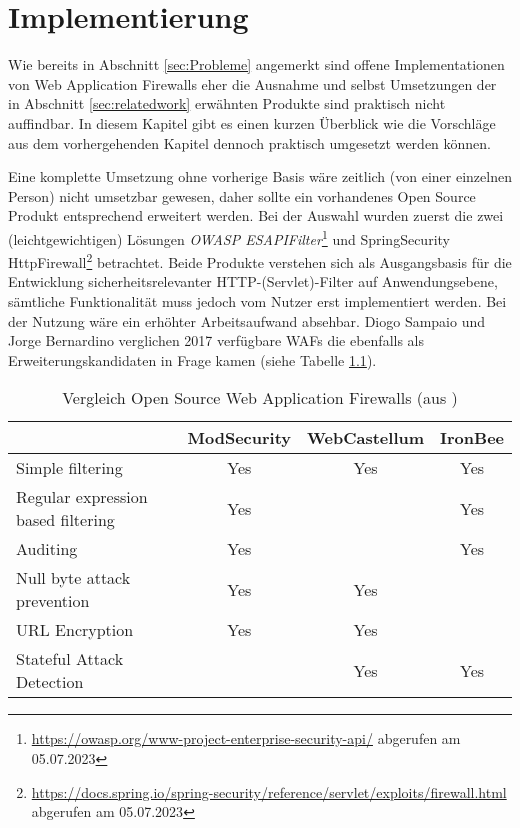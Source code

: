 \chapter{Implementierung}



Wie bereits in Abschnitt \ref{sec:Probleme} angemerkt sind offene Implementationen von Web Application Firewalls eher die Ausnahme und selbst Umsetzungen der in Abschnitt \ref{sec:relatedwork} erwähnten Produkte sind praktisch nicht auffindbar. In diesem Kapitel gibt es einen kurzen Überblick wie die Vorschläge aus dem vorhergehenden Kapitel dennoch praktisch umgesetzt werden können.

Eine komplette Umsetzung ohne vorherige Basis wäre zeitlich (von einer einzelnen Person) nicht umsetzbar gewesen, daher sollte ein vorhandenes Open Source Produkt entsprechend erweitert werden. Bei der Auswahl wurden zuerst die zwei (leichtgewichtigen) Lösungen \emph{OWASP ESAPIFilter}\footnote{\url{https://owasp.org/www-project-enterprise-security-api/} abgerufen am 05.07.2023} und {SpringSecurity HttpFirewall}\footnote{\url{https://docs.spring.io/spring-security/reference/servlet/exploits/firewall.html} abgerufen am 05.07.2023} betrachtet. Beide Produkte verstehen sich als Ausgangsbasis für die Entwicklung sicherheitsrelevanter HTTP-(Servlet)-Filter auf Anwendungsebene, sämtliche Funktionalität muss jedoch vom Nutzer erst implementiert werden. Bei der Nutzung wäre ein erhöhter Arbeitsaufwand absehbar. Diogo Sampaio und Jorge Bernardino verglichen 2017 verfügbare WAFs die ebenfalls als Erweiterungskandidaten in Frage kamen (siehe Tabelle \ref{tab:my_vergos}).


\begin{table}[h]  \centering
  \begin{tabular}{lccc} 
    \toprule
    & \textbf{ModSecurity} & \textbf{WebCastellum} & \textbf{IronBee} \\ [0.5ex] 
    \midrule
    Simple filtering & Yes & Yes & Yes \\ 
    Regular expression based filtering & Yes &  & Yes \\
    Auditing & Yes &  & Yes \\
    Null byte attack prevention & Yes & Yes &  \\
    URL Encryption & Yes & Yes &  \\ [1ex] 
    Stateful Attack Detection & & Yes & Yes \\
    \bottomrule
  \end{tabular}
  \caption{Vergleich Open Source Web Application Firewalls (aus \cite{Sampaio2017}) }
  \label{tab:my_vergos}
\end{table}

